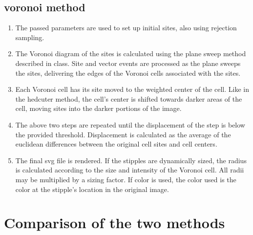 \documentclass[11pt]{article}
\begin{document}
\subsection{voronoi method}
	\begin{enumerate}
	\item The passed parameters are used to set up initial sites, also using rejection sampling.
	\item The Voronoi diagram of the sites is calculated using the plane sweep method described in class. Site and vector events are processed as the plane sweeps the sites, delivering the edges of the Voronoi cells associated with the sites.
	\item Each Voronoi cell has its site moved to the weighted center of the cell. Like in the hedcuter method, the cell's center is shifted towards darker areas of the cell, moving sites into the darker portions of the image.
	\item The above two steps are repeated until the displacement of the step is below the provided threshold. Displacement is calculated as the average of the euclidean differences between the original cell sites and cell centers.
	\item The final svg file is rendered. If the stipples are dynamically sized, the radius is calculated according to the size and intensity of the Voronoi cell. All radii may be multiplied by a sizing factor. If color is used, the color used is the color at the stipple's location in the original image.
	\end{enumerate}
	
\section{Comparison of the two methods}
\end{document}
